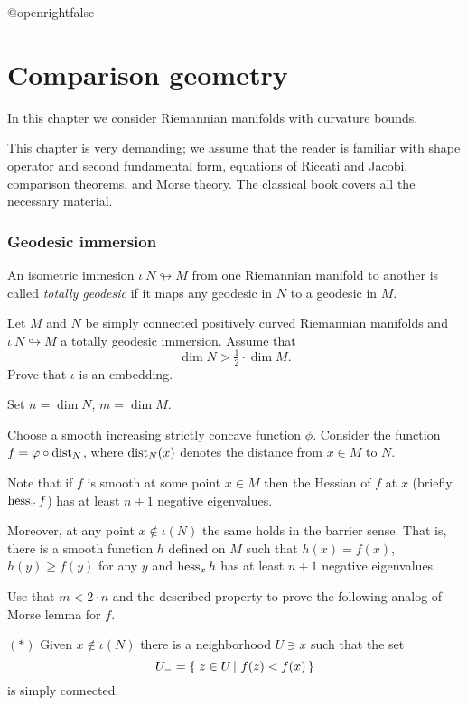 \csname @openrightfalse\endcsname
\chapter{Comparison geometry}

In this chapter we consider Riemannian manifolds with curvature bounds.

This chapter is very demanding;
we assume that the reader is familiar with   
shape operator and second fundamental form, 
equations of Riccati and Jacobi,
comparison theorems,
and Morse theory.
The classical book \cite{cheeger-ebin} covers all the  necessary  material.

\subsection*{Geodesic immersion\hard}
\label{Geodesic immersion}

An isometric immesion $\iota\:N\looparrowright M$ from one Riemannian manifold to another is called \emph{totally geodesic} if it maps any geodesic in $N$ to a geodesic in $M$.

\begin{pr}
Let $M$ and $N$ be simply connected positively curved Riemannian manifolds and $\iota\:N\looparrowright M$ a totally geodesic immersion.
Assume that 
\[\dim N>\tfrac 12\cdot \dim M.\]
Prove that $\iota$ is an embedding.
\end{pr}

Set $n=\dim N$, $m=\dim M$.

Choose a smooth increasing strictly concave function $\phi$.
Consider the function $f=\varphi\circ\operatorname{\rm dist}\nolimits_N$,
where $\operatorname{\rm dist}\nolimits_N(x)$ denotes the distance from $x\in M$ to $N$.

Note that if $f$ is smooth at some point $x\in M$ 
then the Hessian of $f$ at $x$ (briefly $\operatorname{\rm hess}\nolimits_xf$)
has at least $n+1$ negative eigenvalues.

Moreover, at any point $x\notin \iota(N)$ the same holds in the barrier sense\label{page:barrier sense}.
That is, there is a smooth function $h$ defined on $M$
such that $h(x)=f(x)$, $h(y)\ge f(y)$ for any $y$
and $\operatorname{\rm hess}\nolimits_xh$ has at least $n+1$ negative eigenvalues.

Use that $m< 2\cdot n$ and the described property to prove the following
analog of Morse lemma for $f$.

\begin{cl}{$({*})$}
 Given $x\notin \iota(N)$ there is a neighborhood $U\ni x$ such that the set 
\[U_-=\set{z\in U}{f(z)<f(x)}\] is simply connected.
\end{cl}


